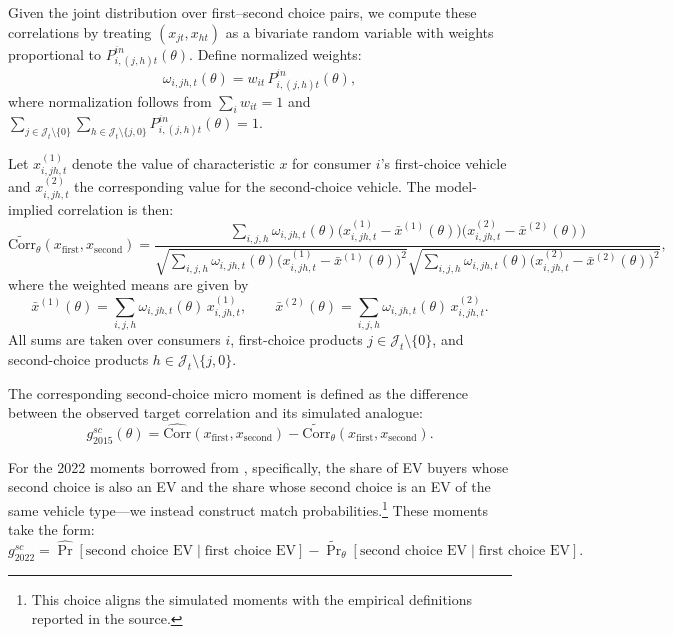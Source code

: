 \documentclass[11pt]{article}
\begin{document}
Given the joint distribution over first–second choice pairs, we compute these correlations by treating \((x_{jt}, x_{ht})\) as a bivariate random variable with weights proportional to \(P_{i,(j,h)t}^{in}(\theta)\). Define normalized weights:
\begin{equation}
\omega_{i,jh,t}(\theta)
=
w_{it}\, P_{i,(j,h)t}^{in}(\theta),
\end{equation}
where normalization follows from \(\sum_i w_{it} = 1\) and
\(\sum_{j \in \mathcal{J}_t \setminus \{0\}} \sum_{h \in \mathcal{J}_t \setminus \{j,0\}} P_{i,(j,h)t}^{in}(\theta) = 1\).

Let \(x^{(1)}_{i,jh,t}\) denote the value of characteristic \(x\) for consumer \(i\)’s first-choice vehicle and \(x^{(2)}_{i,jh,t}\) the corresponding value for the second-choice vehicle. The model-implied correlation is then:
\begin{equation}
\widetilde{\mathrm{Corr}}_{\theta}\!\left(x_{\text{first}}, x_{\text{second}}\right)
=
\frac{
\sum_{i,j,h}
\omega_{i,jh,t}(\theta)
\bigl(x^{(1)}_{i,jh,t} - \bar{x}^{(1)}(\theta)\bigr)
\bigl(x^{(2)}_{i,jh,t} - \bar{x}^{(2)}(\theta)\bigr)
}{
\sqrt{
\sum_{i,j,h}
\omega_{i,jh,t}(\theta)
\bigl(x^{(1)}_{i,jh,t} - \bar{x}^{(1)}(\theta)\bigr)^2
}
\sqrt{
\sum_{i,j,h}
\omega_{i,jh,t}(\theta)
\bigl(x^{(2)}_{i,jh,t} - \bar{x}^{(2)}(\theta)\bigr)^2
}
},
\end{equation}
where the weighted means are given by
\begin{equation}
\bar{x}^{(1)}(\theta)
=
\sum_{i,j,h}
\omega_{i,jh,t}(\theta)\, x^{(1)}_{i,jh,t},
\qquad
\bar{x}^{(2)}(\theta)
=
\sum_{i,j,h}
\omega_{i,jh,t}(\theta)\, x^{(2)}_{i,jh,t}.
\end{equation}
All sums are taken over consumers \(i\), first-choice products \(j \in \mathcal{J}_t \setminus \{0\}\), and second-choice products \(h \in \mathcal{J}_t \setminus \{j,0\}\).

The corresponding second-choice micro moment is defined as the difference between the observed target correlation and its simulated analogue:
\begin{equation}
g^{sc}_{2015}(\theta)
=
\widehat{\mathrm{Corr}}(x_{\text{first}}, x_{\text{second}})
-
\widetilde{\mathrm{Corr}}_{\theta}(x_{\text{first}}, x_{\text{second}}).
\end{equation}

For the 2022 moments borrowed from \cite{allcott_effects_2024}, specifically, the share of EV buyers whose second choice is also an EV and the share whose second choice is an EV of the same vehicle type—we instead construct match probabilities.\footnote{This choice aligns the simulated moments with the empirical definitions reported in the source.} These moments take the form:
\begin{equation}
g^{sc}_{2022}
=
\widehat{\Pr}[\text{second choice EV} \mid \text{first choice EV}]
-
\widetilde{\Pr}_{\theta}[\text{second choice EV} \mid \text{first choice EV}].
\end{equation}
\end{document}
